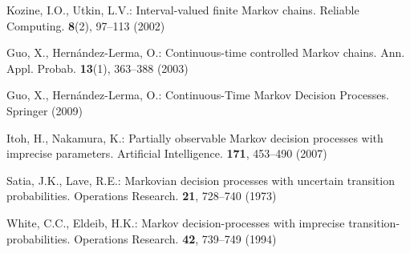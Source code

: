 \begin{thebibliography}{99.}
Kozine, I.O., Utkin, L.V.: {Interval-valued finite Markov chains}.
Reliable Computing. \textbf{8}(2), 97--113 (2002)


Guo, X., Hern{\'a}ndez-Lerma, O.: {Continuous-time controlled Markov chains}. Ann. Appl. Probab. \textbf{13}(1), 363--388 (2003)



Guo, X., Hern{\'a}ndez-Lerma, O.: {Continuous-Time Markov Decision Processes}. Springer (2009)

Itoh, H., Nakamura, K.: {Partially observable Markov decision processes
with imprecise parameters}. Artificial Intelligence. \textbf{171}, 453--490 (2007)

Satia, J.K., Lave, R.E.: {Markovian decision processes with uncertain transition probabilities}. Operations Research. \textbf{21}, 728--740 (1973)

White, C.C., Eldeib,  H.K.: {Markov decision-processes with imprecise transition-probabilities}. Operations Research. \textbf{42}, 739--749 (1994)

\end{thebibliography}
